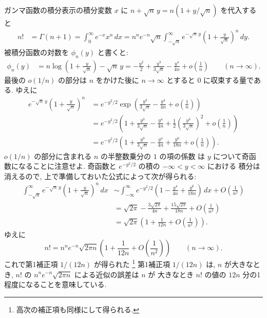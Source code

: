 \documentclass[12pt,twoside]{jarticle}
\theoremstyle{jplain}
\theoremstyle{jplain}
\theoremstyle{jplain}
\numberwithin{theorem}{section}
\numberwithin{equation}{section}
\numberwithin{figure}{section}
\numberwithin{table}{section}
\begin{document}
ガンマ函数の積分表示の積分変数 $x$ に $n+\sqrt{n}\,y=n(1+y/\sqrt{n})$ を代入すると
\begin{align*}
n!
&=\Gamma(n+1)
=\int_0^\infty e^{-x}x^n\,dx
=n^n e^{-n}\sqrt{n}
\int_{-\sqrt{n}}^\infty e^{-\sqrt{n}\,y} \left( 1+\frac{y}{\sqrt{n}} \right)^n \,dy.
\end{align*}
被積分函数の対数を $\phi_n(y)$ と書くと:
\begin{align*}
\phi_n(y)
&=n\log\left(1+\frac{y}{\sqrt{n}}\right)-\sqrt{n}\,y
=-\frac{y^2}{2} + \frac{y^3}{3\sqrt{n}}-\frac{y^4}{4n}+ o\left(\frac{1}{n}\right)
\qquad (n\to\infty).
\end{align*}
最後の $o(1/n)$ の部分は $n$ をかけた後に $n\to\infty$ とすると $0$ に収束する量である.
ゆえに
\begin{align*}
e^{-\sqrt{n}\,y} \left( 1+\frac{y}{\sqrt{n}} \right)^n
&=e^{-y^2/2}
\exp\left( \frac{y^3}{3\sqrt{n}}-\frac{y^4}{4n}+ o\left(\frac{1}{n}\right) \right)
\\ &
=e^{-y^2/2}
\left(
 1
 +\frac{y^3}{3\sqrt{n}}
 -\frac{y^4}{4n}
 +\frac{1}{2}\left( \frac{y^3}{3\sqrt{n}} \right)^2
 +o\left(\frac{1}{n}\right)
\right)
\\ &
=e^{-y^2/2}
\left(
1
+\frac{y^3}{3\sqrt{n}}
-\frac{y^4}{4n}
+\frac{y^6}{18n}
+o\left( \frac{1}{n} \right)
\right).
\end{align*}
$o(1/n)$ の部分に含まれる $n$ の半整数乗分の $1$ の項の係数
は $y$ について奇函数になることに注意せよ.
奇函数と $e^{-y^2/2}$ の積の $-\infty<y<\infty$ における
積分は消えるので, 上で準備しておいた公式によって次が得られる:
\begin{align*}
\int_{-\sqrt{n}}^\infty
e^{-\sqrt{n}\,y} \left( 1+\frac{y}{\sqrt{n}} \right)^n\,dx
& \sim
\int_{-\infty}^{\infty}
e^{-y^2/2}
\left(
 1
 -\frac{y^4}{4n}
 +\frac{y^6}{18n}
\right)
\,dx
+O\left( \frac{1}{n^2} \right)
\\ &
=
\sqrt{2\pi}
-\frac{3\sqrt{2\pi}}{4n}
+\frac{15\sqrt{2\pi}}{18n}
+O\left( \frac{1}{n^2} \right)
\\ &
=\sqrt{2\pi}\left(1 + \frac{1}{12n} + O\left(\frac{1}{n^2}\right) \right).
\end{align*}
ゆえに
\[
n!
=
n^n e^{-n}\sqrt{2\pi n}
\left(1+\frac{1}{12n}+O\left(\frac{1}{n^2}\right)\right)
\qquad(n\to\infty).
\]
これで第1補正項 $1/(12n)$ が得られた%
\footnote{高次の補正項も同様にして得られる.}
第1補正項 $1/(12n)$ は, $n$ が大きなとき,
$n!$ の $n^n e^{-n}\sqrt{2\pi n}$ による近似の誤差は $n$ が
大きなとき $n!$ の値の $12n$ 分の1程度になることを意味している.
\end{document}
